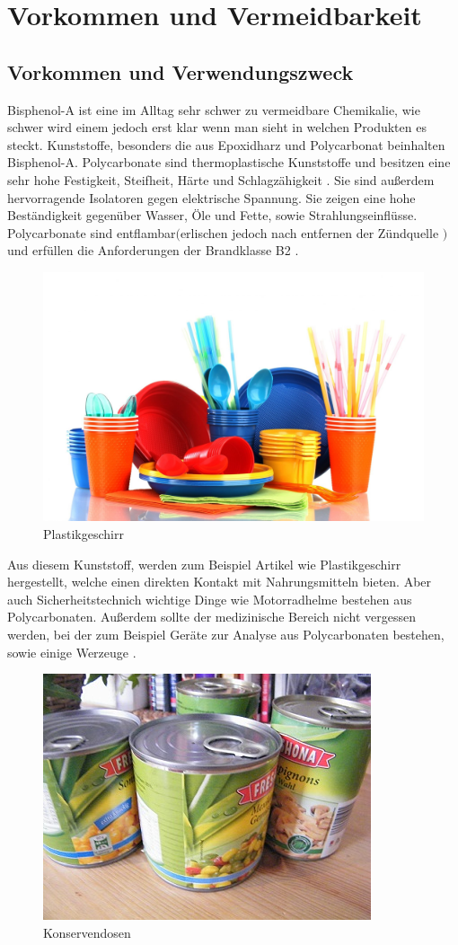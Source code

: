 \section{Vorkommen und Vermeidbarkeit}
\subsection{Vorkommen und Verwendungszweck}
Bisphenol-A ist eine im Alltag sehr schwer zu vermeidbare Chemikalie, wie schwer 
wird einem jedoch erst klar wenn man sieht in welchen Produkten es steckt.
Kunststoffe, besonders die aus Epoxidharz und Polycarbonat
beinhalten Bisphenol-A. Polycarbonate sind thermoplastische Kunststoffe
und besitzen eine sehr hohe Festigkeit, Steifheit, Härte und Schlagzähigkeit \cite{Umweltbundesamt2010}.
Sie sind außerdem hervorragende Isolatoren gegen elektrische Spannung.
Sie zeigen eine hohe Beständigkeit gegenüber Wasser, Öle und Fette, sowie 
Strahlungseinflüsse. Polycarbonate sind entflambar$($erlischen jedoch nach entfernen der Zündquelle
 $)$ \cite{Umweltbundesamt2010} und erfüllen die Anforderungen
der Brandklasse B2 \cite{Wikipedia}.
\begin{figure}[htpb]
    \centering
    \includegraphics[width=.75\textwidth]{Plastikgeschirr.jpeg}
    \caption{Plastikgeschirr \cite{Plastikgeschirr}}
\end{figure}
Aus diesem Kunststoff, werden zum Beispiel Artikel wie Plastikgeschirr
hergestellt, welche einen direkten Kontakt mit 
Nahrungsmitteln bieten. Aber auch Sicherheitstechnich wichtige Dinge wie 
Motorradhelme bestehen aus Polycarbonaten. Außerdem sollte der 
medizinische Bereich nicht vergessen werden, bei der zum Beispiel
Geräte zur Analyse aus Polycarbonaten bestehen, sowie einige Werzeuge 
\cite{Umweltbundesamt2010}.
\begin{figure}[htpb]
    \centering
    \includegraphics[width=.5\textwidth]{Konserven.jpg}
    \caption{Konservendosen \cite{Konserven}}
    \end{figure}
